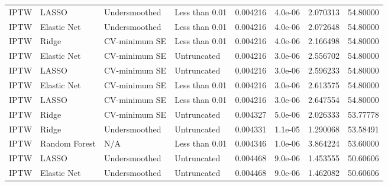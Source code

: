 \begin{longtable}[l]{llllllll}
IPTW & LASSO & Undersmoothed & Less than 0.01 & 0.004216 & 4.0e-06 & 2.070313 & 54.80000\\
IPTW & Elastic Net & Undersmoothed & Less than 0.01 & 0.004216 & 4.0e-06 & 2.072648 & 54.80000\\
IPTW & Ridge & CV-minimum SE & Less than 0.01 & 0.004216 & 4.0e-06 & 2.166498 & 54.80000\\
IPTW & Elastic Net & CV-minimum SE & Untruncated & 0.004216 & 3.0e-06 & 2.556702 & 54.80000\\
IPTW & LASSO & CV-minimum SE & Untruncated & 0.004216 & 3.0e-06 & 2.596233 & 54.80000\\
IPTW & Elastic Net & CV-minimum SE & Less than 0.01 & 0.004216 & 3.0e-06 & 2.613575 & 54.80000\\
IPTW & LASSO & CV-minimum SE & Less than 0.01 & 0.004216 & 3.0e-06 & 2.647554 & 54.80000\\
IPTW & Ridge & CV-minimum SE & Untruncated & 0.004327 & 5.0e-06 & 2.026333 & 53.77778\\
IPTW & Ridge & Undersmoothed & Untruncated & 0.004331 & 1.1e-05 & 1.290068 & 53.58491\\
IPTW & Random Forest & N/A & Less than 0.01 & 0.004346 & 1.0e-06 & 3.864224 & 53.60000\\
IPTW & LASSO & Undersmoothed & Untruncated & 0.004468 & 9.0e-06 & 1.453555 & 50.60606\\
IPTW & Elastic Net & Undersmoothed & Untruncated & 0.004468 & 9.0e-06 & 1.462082 & 50.60606\\
\bottomrule
\end{longtable}
